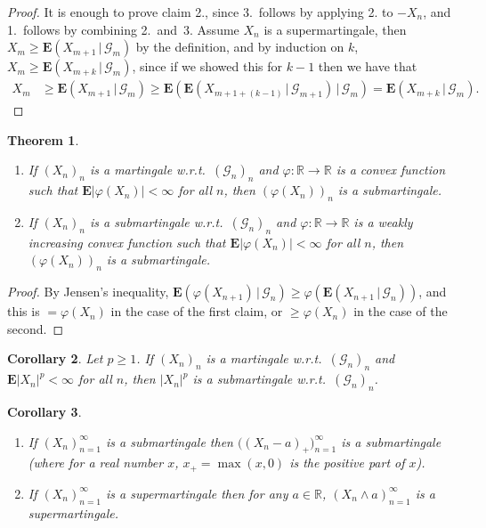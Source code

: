 \documentclass[12pt]{article}
\newtheorem{thm}{Theorem}[section]
\newtheorem{cor}[thm]{Corollary}
\newcommand{\R}{\mathbb{R}}
\newcommand{\expec}{\mathbf{E}}
\newcommand{\condexp}[2]{\expec\left(#1\,|\,#2\right)}
\theoremstyle{example}
\begin{document}
\begin{proof}
It is enough to prove claim 2., since 3.\ follows by applying 2. to $-X_n$, and 1.~follows by combining 2.~and~3.
Assume $X_n$ is a supermartingale, then $X_m\ge \condexp{X_{m+1}}{\mathcal{G}_m}$ by the definition, and by induction on $k$, $X_m\ge \condexp{X_{m+k}}{\mathcal{G}_m}$, since if we showed this for $k-1$ then we have that
\begin{align*}
X_m &\ge \condexp{X_{m+1}}{\mathcal{G}_m}
\ge \condexp{\condexp{X_{m+1+(k-1)}}{\mathcal{G}_{m+1}}}{\mathcal{G}_m}
= \condexp{X_{m+k}}{\mathcal{G}_m}.
\end{align*}
\end{proof}

\begin{thm} 
\begin{enumerate}
\item If $(X_n)_n$ is a martingale w.r.t.\ $(\mathcal{G}_n)_n$ and $\varphi:\R\to\R$ is a convex function such that $\expec|\varphi(X_n)|<\infty$ for all $n$, then $(\varphi(X_n))_n$ is a submartingale.
\item If $(X_n)_n$ is a submartingale w.r.t.\ $(\mathcal{G}_n)_n$ and $\varphi:\R\to\R$ is a weakly increasing convex function such that $\expec|\varphi(X_n)|<\infty$ for all $n$, then $(\varphi(X_n))_n$ is a submartingale.
\end{enumerate}
\end{thm}

\begin{proof}
By Jensen's inequality,
$ \condexp{\varphi(X_{n+1})}{\mathcal{G}_n} \ge \varphi\left(\condexp{X_{n+1}}{\mathcal{G}_n}\right)$, and this is $= \varphi(X_n)$ in the case of the first claim, or $\ge \varphi(X_n)$ in the case of the second.
\end{proof}

\begin{cor} Let $p\ge 1$. If $(X_n)_n$ is a martingale w.r.t.\ $(\mathcal{G}_n)_n$ and $\expec|X_n|^p<\infty$ for all $n$, then $|X_n|^p$ is a submartingale w.r.t.\ $(\mathcal{G}_n)_n$.
\end{cor}

\begin{cor} \label{cor-positive-part}
\begin{enumerate}
\item If $(X_n)_{n=1}^\infty$ is a submartingale then $\big((X_n-a)_+\big)_{n=1}^\infty$ is a submartingale (where for a real number $x$, $x_+ = \max(x,0)$ is the positive part of $x$).
\item If $(X_n)_{n=1}^\infty$ is a supermartingale then for any $a\in\R$, $(X_n\wedge a)_{n=1}^\infty$ is a supermartingale.
\end{enumerate}

\end{cor}
\end{document}
